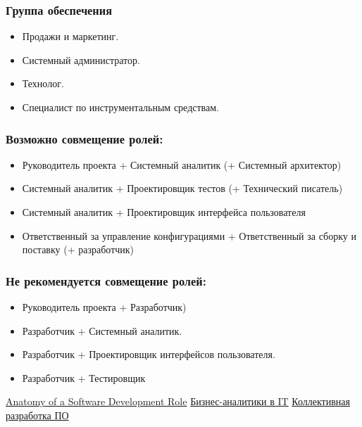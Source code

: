 \documentclass{../industrial-development}
\begin{document}
\begin{frame} \frametitle{Группа обеспечения}
\begin{itemize}
  \item Продажи и маркетинг.
  \item Системный администратор.
  \item Технолог.
  \item Специалист по инструментальным средствам.
  \end{itemize}  
\end{frame}

\begin{frame} \frametitle{Возможно совмещение ролей:}
\begin{itemize}
\item Руководитель проекта + Системный аналитик (+ Системный архитектор)
\item Системный аналитик + Проектировщик тестов (+ Технический писатель)
\item Системный аналитик + Проектировщик интерфейса пользователя
\item Ответственный за управление конфигурациями + Ответственный за сборку и поставку (+ разработчик)
\end{itemize}  
\end{frame}

\begin{frame} \frametitle{Не рекомендуется совмещение ролей:}
\begin{itemize}
\item Руководитель проекта + Разработчик)
\item Разработчик + Системный аналитик.
\item Разработчик + Проектировщик интерфейсов пользователя.
\item Разработчик + Тестировщик
\end{itemize}  
\end{frame}

\begin{thebibliography}{99}

 \href{https://www.developer.com/tools/article.php/3526491/}{Anatomy of a Software Development Role}
 \href{https://itkeys.org/business-analysts/}{Бизнес-аналитики в IT}
 \href{http://vit-prog.narod.ru/page/TRPP/section_3/subjec_3.2.htm}{Коллективная разработка ПО}
\end{thebibliography}
\end{document}
